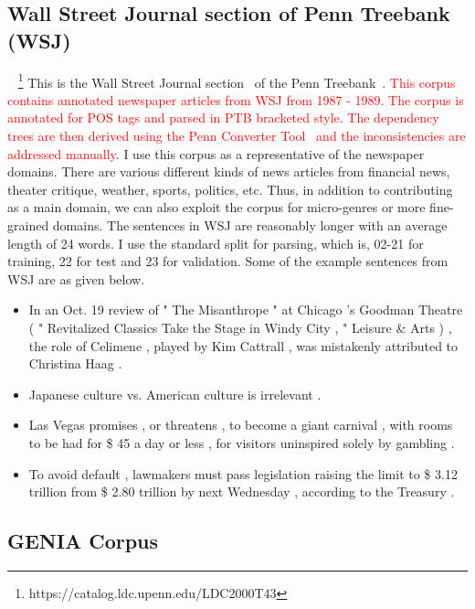   
\subsection{Wall Street Journal section of Penn Treebank (WSJ)}

~
\footnote{https://catalog.ldc.upenn.edu/LDC2000T43}
This is the Wall Street Journal section~\citep{Marcus:1994:PTA:1075812.1075835} of the Penn Treebank~\citep{santorini:90}. \textcolor{red}{This corpus contains annotated newspaper articles from WSJ from 1987 - 1989. The corpus is annotated for POS tags and parsed in PTB bracketed style. The dependency trees are then derived using the Penn Converter Tool~\citep{johansson2007a} and the inconsistencies are addressed manually}. I use this corpus as a representative of the newspaper domains. There are various different kinds of news articles from financial news, theater critique, weather, sports, politics, etc. Thus, in addition to contributing as a main domain, we can also exploit the corpus for micro-genres or more fine-grained domains. The sentences in WSJ are reasonably longer with an average length of 24 words. I use the standard split for parsing, which is, 02-21 for training, 22 for test and 23 for validation. Some of the example sentences from WSJ are as given below.  ~
\begin{itemize}
    \item In an Oct. 19 review of " The Misanthrope " at Chicago 's Goodman Theatre ( " Revitalized Classics Take the Stage in Windy City , " Leisure & Arts ) , the role of Celimene , played by Kim Cattrall , was mistakenly attributed to Christina Haag .
    \item Japanese culture vs. American culture is irrelevant .
    \item Las Vegas promises , or threatens , to become a giant carnival , with rooms to be had for \$ 45 a day or less , for visitors uninspired solely by gambling  .
    \item To avoid default , lawmakers must pass legislation raising the limit to \$ 3.12 trillion from \$ 2.80 trillion by next Wednesday , according to the Treasury .
     
\end{itemize}

\subsection{GENIA Corpus}

